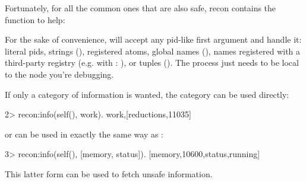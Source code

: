 \documentclass[11pt, oneside]{book}   	%
\begin{document}
Fortunately, for all the common ones that are also safe, recon contains the  function to help:


For the sake of convenience,  will accept any pid-like first argument and handle it: literal pids, strings (), registered atoms, global names (), names registered with a third-party registry (e.g. with : ), or tuples (). The process just needs to be local to the node you're debugging.

If only a category of information is wanted, the category can be used directly:

\begin{VerbatimEshell}
2> recon:info(self(), work).
{work,[{reductions,11035}]}
\end{VerbatimEshell}

or can be used in exactly the same way as :

\begin{VerbatimEshell}
3> recon:info(self(), [memory, status]).
[{memory,10600},{status,running}]
\end{VerbatimEshell}

This latter form can be used to fetch unsafe information.
\end{document}
